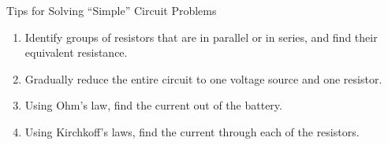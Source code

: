 \documentclass[12pt,aspectratio=169]{beamer}
\begin{document}
%



\begin{frame}{Tips for Solving ``Simple'' Circuit Problems}
  \begin{enumerate}
  \item Identify groups of resistors that are in parallel or in series, and
    find their equivalent resistance.
  \item Gradually reduce the entire circuit to one voltage source and one
    resistor.
  \item Using Ohm's law, find the current out of the battery.
  \item Using Kirchkoff's laws, find the current through each of the resistors.
  \end{enumerate}
\end{frame}
\end{document}
